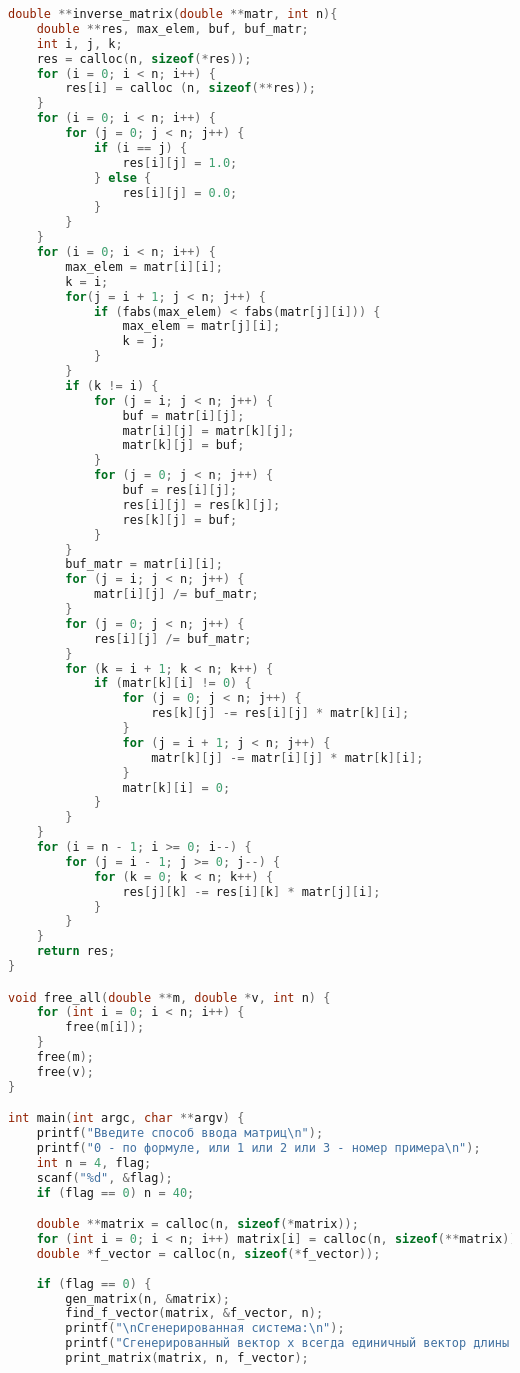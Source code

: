 \documentclass[a4paper,12pt,titlepage,finall]{article}
\begin{document}
\begin{lstlisting}[language=C, caption=main.c]
double **inverse_matrix(double **matr, int n){
    double **res, max_elem, buf, buf_matr;
    int i, j, k;
    res = calloc(n, sizeof(*res));
    for (i = 0; i < n; i++) {
        res[i] = calloc (n, sizeof(**res));
    }
    for (i = 0; i < n; i++) {
        for (j = 0; j < n; j++) {
            if (i == j) {
                res[i][j] = 1.0;
            } else {
                res[i][j] = 0.0;
            }
        }
    }
    for (i = 0; i < n; i++) {
        max_elem = matr[i][i];
        k = i;
        for(j = i + 1; j < n; j++) {
            if (fabs(max_elem) < fabs(matr[j][i])) {
                max_elem = matr[j][i];
                k = j;
            }
        }
        if (k != i) {
            for (j = i; j < n; j++) {
                buf = matr[i][j];
                matr[i][j] = matr[k][j];
                matr[k][j] = buf;
            }
            for (j = 0; j < n; j++) {
                buf = res[i][j];
                res[i][j] = res[k][j];
                res[k][j] = buf;
            }
        }
        buf_matr = matr[i][i];
        for (j = i; j < n; j++) {
            matr[i][j] /= buf_matr;
        }
        for (j = 0; j < n; j++) {
            res[i][j] /= buf_matr;
        }
        for (k = i + 1; k < n; k++) {
            if (matr[k][i] != 0) {
                for (j = 0; j < n; j++) {
                    res[k][j] -= res[i][j] * matr[k][i];
                }
                for (j = i + 1; j < n; j++) {
                    matr[k][j] -= matr[i][j] * matr[k][i];
                }
                matr[k][i] = 0;
            }
        }
    }
    for (i = n - 1; i >= 0; i--) {
        for (j = i - 1; j >= 0; j--) {
            for (k = 0; k < n; k++) {
                res[j][k] -= res[i][k] * matr[j][i];
            }
        }
    }
    return res;
}

void free_all(double **m, double *v, int n) {
    for (int i = 0; i < n; i++) {
        free(m[i]);
    }
    free(m);
    free(v);
}

int main(int argc, char **argv) {
    printf("Введите способ ввода матриц\n");
    printf("0 - по формуле, или 1 или 2 или 3 - номер примера\n");
    int n = 4, flag;
    scanf("%d", &flag);
    if (flag == 0) n = 40;

    double **matrix = calloc(n, sizeof(*matrix));
    for (int i = 0; i < n; i++) matrix[i] = calloc(n, sizeof(**matrix));
    double *f_vector = calloc(n, sizeof(*f_vector));
    
    if (flag == 0) {
        gen_matrix(n, &matrix);
        find_f_vector(matrix, &f_vector, n);
        printf("\nСгенерированная система:\n");
        printf("Сгенерированный вектор x всегда единичный вектор длины n\n");
        print_matrix(matrix, n, f_vector);
        

\end{lstlisting}
\end{document}
